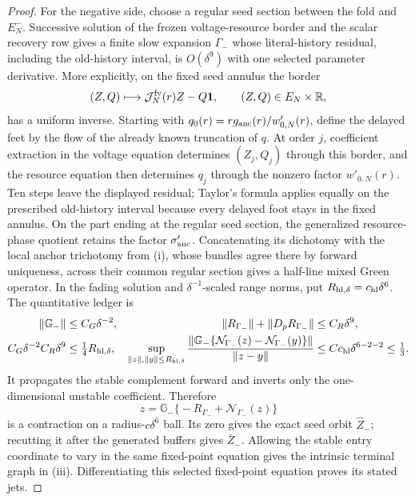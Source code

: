 \begin{proof}
For the negative side, choose a regular seed section between the
fold and \(E_N^-\).  Successive solution of the frozen voltage-resource
border and the scalar recovery row gives a finite slow expansion
\(\Gamma_-\) whose literal-history residual, including the old-history
interval, is \(O(\delta^9)\) with one selected parameter derivative.  More
explicitly, on the fixed seed annulus the border
\[
 (Z,Q)\longmapsto
 \mathcal J_N^{\rm fv}(r)Z-Q\mathbf1,\qquad
 (Z,Q)\in E_N\times\mathbb R,
\]
has a uniform inverse.  Starting with
\(q_0(r)=r g_{\rm anc}(r)/w'_{0,N}(r)\), define the delayed feet by the
flow of the already known truncation of \(q\).  At order \(j\), coefficient
extraction in the voltage equation determines \((Z_j,Q_j)\) through this
border, and the resource equation then determines \(q_j\) through the
nonzero factor \(w'_{0,N}(r)\).  Ten steps leave the displayed residual;
Taylor's formula applies equally on the prescribed old-history interval
because every delayed foot stays in the fixed annulus.  On the part ending at
the regular seed section, the generalized resource-phase quotient retains
the factor \(\sigma_{\rm anc}'\).  Concatenating its dichotomy with the local
anchor trichotomy from (i), whose bundles agree there by forward uniqueness,
across their common regular section gives a
half-line mixed Green operator.  In the fading solution and
\(\delta^{-1}\)-scaled range norms, put
\(R_{{\rm hl},\delta}=c_{\rm hl}\delta^6\).  The quantitative ledger is
\begin{align}
 \|\mathbb G_-\|&\le C_G\delta^{-2},&
 \|R_{\Gamma_-}\|+\|D_pR_{\Gamma_-}\|&\le C_R\delta^9,\notag\\
 C_G\delta^{-2}C_R\delta^9
 &\le\tfrac14R_{{\rm hl},\delta},&
 \sup_{\|z\|,\|y\|\le R_{{\rm hl},\delta}}
 \frac{\|\mathbb G_-\{\mathcal N_{\Gamma_-}(z)
             -\mathcal N_{\Gamma_-}(y)\}\|}
      {\|z-y\|}
 &\le Cc_{\rm hl}\delta^{6-2-2}\le\tfrac13 .
 \label{eq:lean-anchor-negative-ledger}
\end{align}
It propagates the stable complement forward
and inverts only the one-dimensional unstable coefficient.  Therefore
\[
 z=\mathbb G_-\bigl\{-R_{\Gamma_-}+\mathcal N_{\Gamma_-}(z)\bigr\}
\]
is a contraction on a radius-\(c\delta^6\) ball.  Its zero gives the exact
seed orbit \(\widehat Z_-\); recutting it after the generated buffers gives
\(\bar Z_-\).  Allowing the stable entry coordinate to vary in the
same fixed-point equation gives the intrinsic terminal graph in (iii).
Differentiating this selected fixed-point equation proves its stated jets.


\end{proof}
